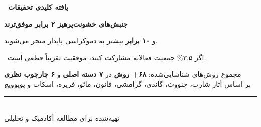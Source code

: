 \documentclass[a4paper,12pt]{article}
\begin{document}
\begin{summarybox}

\begin{center}
{\large\bfseries\textcolor{greenPrimary}{\faStar\ یافته کلیدی تحقیقات}}
\end{center}

\vspace{8pt}

\begin{center}
{\Large\bfseries\textcolor{greenLight}{جنبش‌های خشونت‌پرهیز ۲ برابر موفق‌ترند}}

\vspace{4pt}

{\large و \textbf{۱۰ برابر} بیشتر به دموکراسی پایدار منجر می‌شوند.}

\vspace{8pt}

\textcolor{yellowPrimary}{\faStar\ اگر ۳.۵\% جمعیت فعالانه مشارکت کنند، موفقیت تقریباً قطعی است.}
\end{center}

\end{summarybox}

\vspace{12pt}

\begin{center}
\textcolor{textMuted}{\small
مجموع روش‌های شناسایی‌شده: \textcolor{purpleLight}{\textbf{۶۸+ روش}} در \textcolor{purpleLight}{\textbf{۷ دسته اصلی}} و \textcolor{purpleLight}{\textbf{۶ چارچوب نظری}}\\[4pt]
بر اساس آثار شارپ، چنووث، گاندی، گرامشی، فانون، مائو، فریره، اسکات و پوپوویچ\\[8pt]
\textcolor{textMuted}{\rule{8cm}{0.5pt}}\\[4pt]
تهیه‌شده برای مطالعه آکادمیک و تحلیلی
}
\end{center}
\end{document}
